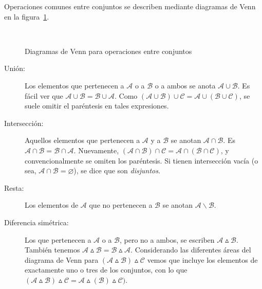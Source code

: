   Operaciones comunes entre conjuntos%
  se describen mediante diagramas de Venn
  en la figura~\ref{fig:Venn}.%
  \begin{figure}[htbp]
    \centering
    \qquad

    \qquad
    \\
    \caption{Diagramas de Venn para operaciones entre conjuntos}
    \label{fig:Venn}
  \end{figure}
  \begin{description}
  \item[Unión:]
    Los elementos que pertenecen a \(\mathcal{A}\)
    o a \(\mathcal{B}\) o a ambos
    se anota \(\mathcal{A} \cup \mathcal{B}\).
    Es fácil ver
      que \(\mathcal{A} \cup \mathcal{B}
	      = \mathcal{B} \cup \mathcal{A}\).
    Como \((\mathcal{A} \cup \mathcal{B}) \cup \mathcal{C}
	      = \mathcal{A} \cup (\mathcal{B} \cup \mathcal{C})\),
    se suele omitir el paréntesis en tales expresiones.%
  \item[Intersección:]
    Aquellos elementos
    que pertenecen a \(\mathcal{A}\) y a \(\mathcal{B}\)
    se anotan \(\mathcal{A} \cap \mathcal{B}\).
    Es \(\mathcal{A} \cap \mathcal{B}
	   = \mathcal{B} \cap \mathcal{A}\).
    Nuevamente,
    \((\mathcal{A} \cap \mathcal{B}) \cap \mathcal{C}
	 = \mathcal{A} \cap (\mathcal{B} \cap \mathcal{C})\),
    y convencionalmente se omiten los paréntesis.%
    Si tienen intersección vacía
    (o sea,
    \(\mathcal{A} \cap \mathcal{B} = \varnothing\)),
    se dice que son \emph{disjuntos}.%
  \item[Resta:]
    Los elementos de \(\mathcal{A}\)
    que no pertenecen a \(\mathcal{B}\)
    se anotan \(\mathcal{A} \smallsetminus \mathcal{B}\).
  \item[Diferencia simétrica:]
    Los que pertenecen a \(\mathcal{A}\) o a \(\mathcal{B}\),
    pero no a ambos,
    se escriben \(\mathcal{A} \vartriangle \mathcal{B}\).
    También tenemos
      \(\mathcal{A} \vartriangle \mathcal{B}
	  = \mathcal{B} \vartriangle \mathcal{A}\).
    Considerando las diferentes áreas del diagrama de Venn
    para \((\mathcal{A} \vartriangle \mathcal{B}) \vartriangle \mathcal{C}\)
    vemos que incluye los elementos de exactamente uno o tres de los conjuntos,
    con lo que
    \((\mathcal{A} \vartriangle \mathcal{B}) \vartriangle \mathcal{C}
         = \mathcal{A} \vartriangle (\mathcal{B}) \vartriangle \mathcal{C})\).%


\end{description}
